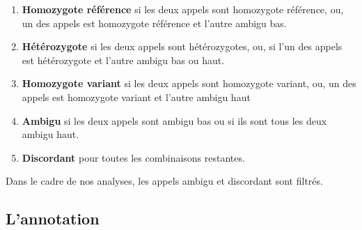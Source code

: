 \documentclass[12pt,twoside]{reedthesis}
\providecommand{\tightlist}{%
  \setlength{\itemsep}{0pt}\setlength{\parskip}{0pt}}
\theoremstyle{definition}
\theoremstyle{definition}
\theoremstyle{remark}
\begin{document}
  \begin{enumerate}
  \def\labelenumi{\arabic{enumi}.}
  \tightlist
  \item
    \textbf{Homozygote référence} si les deux appels sont homozygote
    référence, ou, un des appels est homozygote référence et l'autre
    ambigu bas.
  \item
    \textbf{Hétérozygote} si les deux appels sont hétérozygotes, ou, si
    l'un des appels est hétérozygote et l'autre ambigu bas ou haut.\\
  \item
    \textbf{Homozygote variant} si les deux appels sont homozygote
    variant, ou, un des appels est homozygote variant et l'autre ambigu
    haut
  \item
    \textbf{Ambigu} si les deux appels sont ambigu bas ou si ils sont tous
    les deux ambigu haut.\\
  \item
    \textbf{Discordant} pour toutes les combinaisons restantes.
  \end{enumerate}
  
  Dans le cadre de nos analyses, les appels ambigu et discordant sont
  filtrés.
  
  \newpage
  
  \subsection{L'annotation}\label{lannotation}
  
\end{document}
